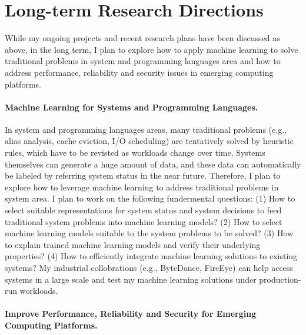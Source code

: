 \documentclass[10pt]{article}
\begin{document}
\section{Long-term Research Directions}

While my ongoing projects and recent research plans have been discussed as above,
in the long term, I plan to explore how to apply machine learning to solve
traditional problems in system and programming languages area and 
how to address performance, reliability and security issues 
in emerging computing platforms. 


\vspace{-.1in}
\paragraph{Machine Learning for Systems and Programming Languages.} 
In system and programming languages areas, 
many traditional problems (e.g., alias analysis, cache eviction, I/O scheduling) 
are tentatively solved by heuristic rules, which have to be revisted as 
workloads change over time. 
Systems themselves can generate a huge amount of data, 
and these data can automatically be labeled by 
referring system status in the near future. 
Therefore, I plan to explore how to leverage machine learning
to address traditional problems in system area.
I plan to work on the following fundermental questions:
(1) How to select suitable representations for system status 
and system decisions to feed traditional system problems 
into machine learning models?
(2) How to select machine learning models suitable 
to the system problems to be solved?
(3) How to explain trained machine learning models 
and verify their underlying properties?
(4) How to efficiently integrate machine 
learning solutions to existing systems?
My industrial collobrations (e.g., ByteDance, FireEye) 
can help access systems in a large scale and test my machine learning 
solutions under production-run workloads. 


\vspace{-.1in}
\paragraph{Improve Performance, Reliability and Security for Emerging Computing Platforms.} 
\end{document}
